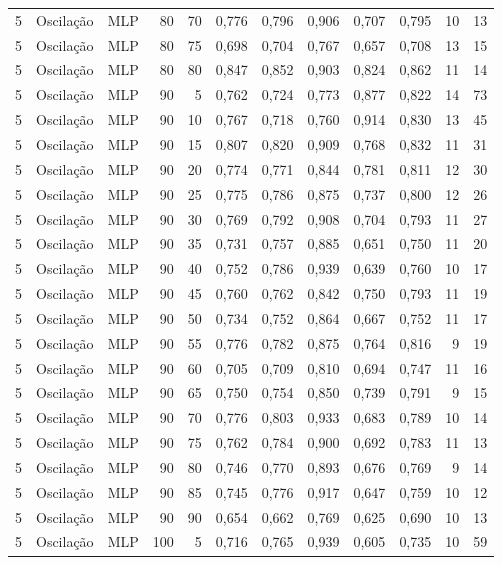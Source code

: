 \begin{longtable}{@{}rllrrrrrrrrr@{}}
5 & Oscilação & MLP & 80 & 70 & 0,776 & 0,796 & 0,906 & 0,707 & 0,795 & 10 & 13 \\
5 & Oscilação & MLP & 80 & 75 & 0,698 & 0,704 & 0,767 & 0,657 & 0,708 & 13 & 15 \\
5 & Oscilação & MLP & 80 & 80 & 0,847 & 0,852 & 0,903 & 0,824 & 0,862 & 11 & 14 \\
5 & Oscilação & MLP & 90 & 5 & 0,762 & 0,724 & 0,773 & 0,877 & 0,822 & 14 & 73 \\
5 & Oscilação & MLP & 90 & 10 & 0,767 & 0,718 & 0,760 & 0,914 & 0,830 & 13 & 45 \\
5 & Oscilação & MLP & 90 & 15 & 0,807 & 0,820 & 0,909 & 0,768 & 0,832 & 11 & 31 \\
5 & Oscilação & MLP & 90 & 20 & 0,774 & 0,771 & 0,844 & 0,781 & 0,811 & 12 & 30 \\
5 & Oscilação & MLP & 90 & 25 & 0,775 & 0,786 & 0,875 & 0,737 & 0,800 & 12 & 26 \\
5 & Oscilação & MLP & 90 & 30 & 0,769 & 0,792 & 0,908 & 0,704 & 0,793 & 11 & 27 \\
5 & Oscilação & MLP & 90 & 35 & 0,731 & 0,757 & 0,885 & 0,651 & 0,750 & 11 & 20 \\
5 & Oscilação & MLP & 90 & 40 & 0,752 & 0,786 & 0,939 & 0,639 & 0,760 & 10 & 17 \\
5 & Oscilação & MLP & 90 & 45 & 0,760 & 0,762 & 0,842 & 0,750 & 0,793 & 11 & 19 \\
5 & Oscilação & MLP & 90 & 50 & 0,734 & 0,752 & 0,864 & 0,667 & 0,752 & 11 & 17 \\
5 & Oscilação & MLP & 90 & 55 & 0,776 & 0,782 & 0,875 & 0,764 & 0,816 & 9 & 19 \\
5 & Oscilação & MLP & 90 & 60 & 0,705 & 0,709 & 0,810 & 0,694 & 0,747 & 11 & 16 \\
5 & Oscilação & MLP & 90 & 65 & 0,750 & 0,754 & 0,850 & 0,739 & 0,791 & 9 & 15 \\
5 & Oscilação & MLP & 90 & 70 & 0,776 & 0,803 & 0,933 & 0,683 & 0,789 & 10 & 14 \\
5 & Oscilação & MLP & 90 & 75 & 0,762 & 0,784 & 0,900 & 0,692 & 0,783 & 11 & 13 \\
5 & Oscilação & MLP & 90 & 80 & 0,746 & 0,770 & 0,893 & 0,676 & 0,769 & 9 & 14 \\
5 & Oscilação & MLP & 90 & 85 & 0,745 & 0,776 & 0,917 & 0,647 & 0,759 & 10 & 12 \\
5 & Oscilação & MLP & 90 & 90 & 0,654 & 0,662 & 0,769 & 0,625 & 0,690 & 10 & 13 \\
5 & Oscilação & MLP & 100 & 5 & 0,716 & 0,765 & 0,939 & 0,605 & 0,735 & 10 & 59 \\

\end{longtable}

